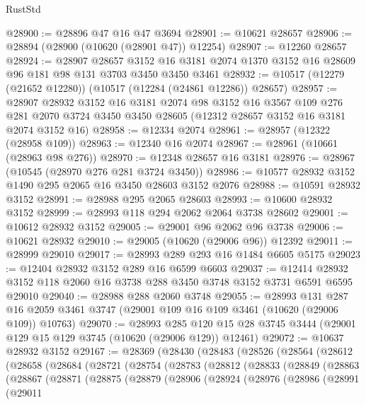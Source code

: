 \begin{lexlean}{RustStd}
\begin{coremodule}
@28900 := @28896 @47 @16 @47 @3694
@28901 := @10621 @28657
@28906 := @28894 (@28900 (@10620 (@28901 @47)) @12254)
@28907 := @12260 @28657
@28924 := @28907
    @28657
    @3152
    @16
    @3181
    @2074
    @1370
    @3152
    @16
    @28609
    @96
    @181
    @98
    @131
    @3703
    @3450
    @3450
    @3461
@28932 := @10517 (@12279 (@21652 @12280)) (@10517 (@12284 (@24861 @12286)) @28657)
@28957 := @28907
    @28932
    @3152
    @16
    @3181
    @2074
    @98
    @3152
    @16
    @3567
    @109
    @276
    @281
    @2070
    @3724
    @3450
    @3450
    @28605
    (@12312 @28657 @3152 @16 @3181 @2074 @3152 @16)
@28958 := @12334 @2074
@28961 := @28957 (@12322 (@28958 @109))
@28963 := @12340 @16 @2074
@28967 := @28961 (@10661 (@28963 @98 @276))
@28970 := @12348 @28657 @16 @3181
@28976 := @28967 (@10545 (@28970 @276 @281 @3724 @3450))
@28986 := @10577 @28932 @3152 @1490 @295 @2065 @16 @3450 @28603 @3152 @2076
@28988 := @10591 @28932 @3152
@28991 := @28988 @295 @2065 @28603
@28993 := @10600 @28932 @3152
@28999 := @28993 @118 @294 @2062 @2064 @3738 @28602
@29001 := @10612 @28932 @3152
@29005 := @29001 @96 @2062 @96 @3738
@29006 := @10621 @28932
@29010 := @29005 (@10620 (@29006 @96)) @12392
@29011 := @28999 @29010
@29017 := @28993 @289 @293 @16 @1484 @6605 @5175
@29023 := @12404 @28932 @3152 @289 @16 @6599 @6603
@29037 := @12414 @28932 @3152 @118 @2060 @16 @3738 @288 @3450 @3748 @3152 @3731 @6591 @6595 @29010
@29040 := @28988 @288 @2060 @3748
@29055 := @28993
    @131
    @287
    @16
    @2059
    @3461
    @3747
    (@29001 @109 @16 @109 @3461 (@10620 (@29006 @109)) @10763)
@29070 := @28993
    @285
    @120
    @15
    @28
    @3745
    @3444
    (@29001 @129 @15 @129 @3745 (@10620 (@29006 @129)) @12461)
@29072 := @10637 @28932 @3152
@29167 := @28369
    (@28430
      (@28483
        (@28526
          (@28564
            (@28612
              (@28658
                (@28684
                  (@28721
                    (@28754
                      (@28783
                        (@28812
                          (@28833
                            (@28849
                              (@28863
                                (@28867
                                  (@28871
                                    (@28875
                                      (@28879
                                        (@28906
                                          (@28924
                                            (@28976
                                              (@28986
                                                (@28991
                                                  (@29011

\end{coremodule}
\end{lexlean}
